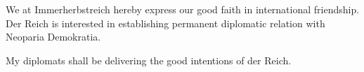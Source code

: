 



\ttfamily\raggedright
We at Immerherbstreich hereby express our good faith in international friendship.
Der Reich is interested in establishing permanent diplomatic relation with Neoparia Demokratia.

My diplomats shall be delivering the good intentions of der Reich.



